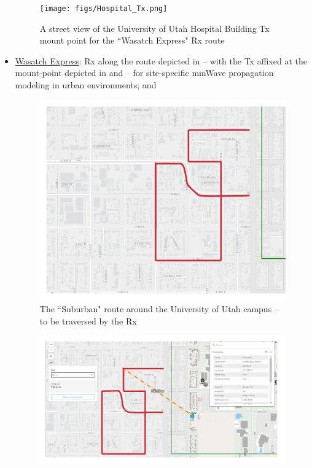 \documentclass[12pt]{article}
\newcommand{\areaofinterestfigwidth}{1.0\textwidth}
\begin{document}
\begin{itemize}
            \begin{figure}
                \centering
                \texttt{[image: figs/Hospital\_Tx.png]}
                \caption{A street view of the University of Utah Hospital Building Tx mount point for the ``Wasatch Express" Rx route}
                \label{fig:Tx_5_details}
            \end{figure}
            \item \underline{Wasatch Express}: Rx along the route depicted in  -- with the Tx affixed at the mount-point depicted in  and  -- for site-specific mmWave propagation modeling in urban environments; and
            
            \begin{figure}
                \centering
                \includegraphics[width=\areaofinterestfigwidth]{figs/Suburban_Route_6_Zoomed.png}
                \caption{The ``Suburban" route around the University of Utah campus -- to be traversed by the Rx}
                \label{fig:Rx_6}
            \end{figure}
            \begin{figure}
                \centering
                \includegraphics[width=\areaofinterestfigwidth]{figs/Suburban_Route_6_Friendship_Tx.png}

\end{figure}
\end{itemize}
\end{document}
